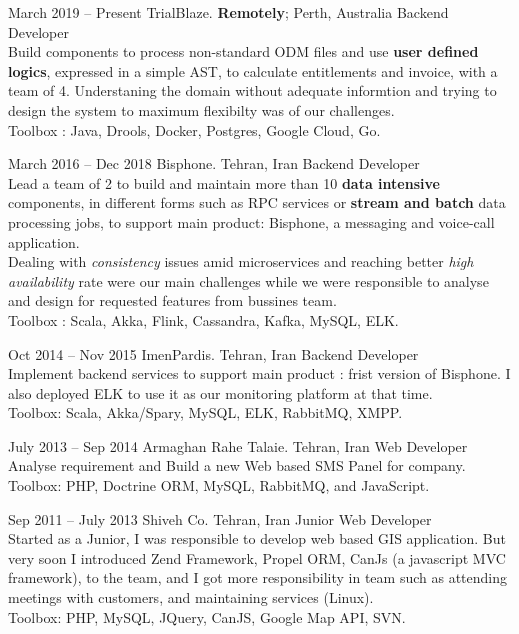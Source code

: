 \documentclass{tccv}
\begin{document}
\begin{eventlist}

\item{March 2019 -- Present}
  {TrialBlaze. \textbf{Remotely}; Perth, Australia}
  {Backend Developer}
  \\Build components to process non-standard ODM files and use \textbf{user defined logics}, expressed in a simple AST, to calculate entitlements and invoice, with a team of 4. Understaning the domain without adequate informtion and trying to design the system to maximum flexibilty was of our challenges.\\Toolbox : Java, Drools, Docker, Postgres, Google Cloud, Go.

\item{March 2016 -- Dec 2018}
  {Bisphone. Tehran, Iran}
  {Backend Developer}
  \\Lead a team of 2 to build and maintain more than 10 \textbf{data intensive} components, in different forms such as RPC services or \textbf{stream and batch} data processing jobs, to support main product: Bisphone, a messaging and voice-call application.\\Dealing with \textit{consistency} issues amid microservices and reaching better \textit{high availability} rate were our main challenges while we were responsible to analyse and design for requested features from bussines team.\\Toolbox : Scala, Akka, Flink, Cassandra, Kafka, MySQL, ELK.

\item{Oct 2014 -- Nov 2015}
  {ImenPardis. Tehran, Iran}
  {Backend Developer}
  \\Implement backend services to support main product : frist version of Bisphone. I also deployed ELK to use it as our monitoring platform at that time.\\Toolbox: Scala, Akka/Spary, MySQL, ELK, RabbitMQ, XMPP.

\item{July 2013 -- Sep 2014}
  {Armaghan Rahe Talaie. Tehran, Iran}
  {Web Developer}
  \\Analyse requirement and Build a new Web based SMS Panel for company.\\Toolbox: PHP, Doctrine ORM, MySQL, RabbitMQ, and JavaScript.

\item{Sep 2011 -- July 2013}
  {Shiveh Co. Tehran, Iran}
  {Junior Web Developer}
  \\Started as a Junior, I was responsible to develop web based GIS application. But very soon I introduced Zend Framework, Propel ORM, CanJs (a javascript MVC framework), to the team, and I got more responsibility in team such as attending meetings with customers, and maintaining services (Linux).\\Toolbox: PHP, MySQL, JQuery, CanJS, Google Map API, SVN.

\end{eventlist}
\end{document}
